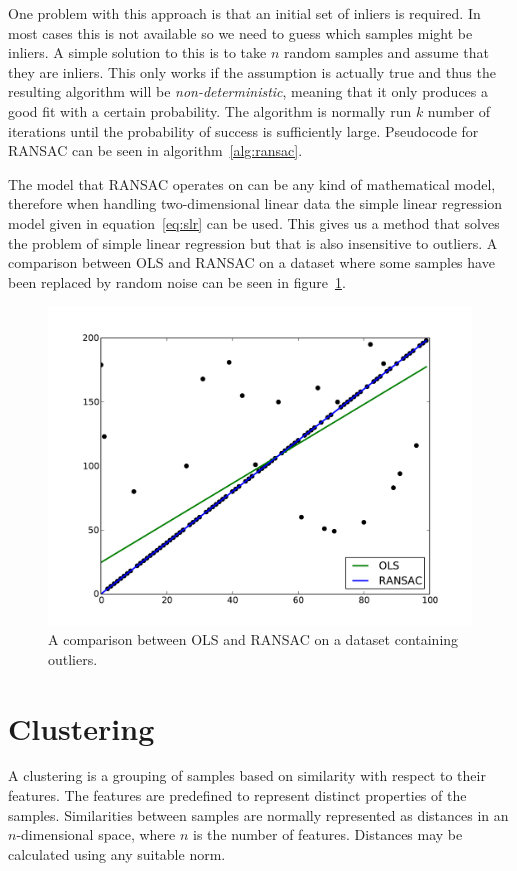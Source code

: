 \documentclass[a4paper]{report}
\begin{document}
One problem with this approach is that an initial set of inliers is required.
In most cases this is not available so we need to guess which samples might be
inliers. A simple solution to this is to take $n$ random samples and assume
that they are inliers. This only works if the assumption is actually true and
thus the resulting algorithm will be \emph{non-deterministic}, meaning that it
only produces a good fit with a certain probability. The algorithm is normally
run $k$ number of iterations until the probability of success is sufficiently
large. Pseudocode for RANSAC can be seen in algorithm~\ref{alg:ransac}.

The model that RANSAC operates on can be any kind of mathematical model, 
therefore when handling two-dimensional linear data the simple linear
regression model given in equation~\ref{eq:slr} can be used. This gives us a
method that solves the problem of simple linear regression but that is also
insensitive to outliers. A comparison between OLS and RANSAC on a dataset where
some samples have been replaced by random noise can be seen in
figure~\ref{fig:ransac}.

\begin{figure}[t]
    \includegraphics[width=\linewidth]{ransac}
    \caption{A comparison between OLS and RANSAC on a dataset containing outliers.}
    \label{fig:ransac}
\end{figure}

\section{Clustering}
A clustering is a grouping of samples based on similarity with respect to their
features. The features are predefined to represent distinct properties of the
samples. Similarities between samples are normally represented as distances in
an $n$-dimensional space, where $n$ is the number of features. Distances may be
calculated using any suitable norm.
\end{document}
